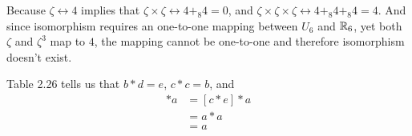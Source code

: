 \documentclass[12pt]{article}
\begin{document}
\begin{problem}[1.37]
Because $\zeta \leftrightarrow 4$ implies that $\zeta \times \zeta \leftrightarrow 4 +_{8} 4 = 0$, and $\zeta \times  \zeta \times \zeta \leftrightarrow 4+_{8} 4+_{8} 4 = 4$. And since isomorphism requires an one-to-one mapping between $U_6$ and $\mathbb{R}_6$, yet both $\zeta$ and $\zeta^3$ map to $4$, the mapping cannot be one-to-one and therefore isomorphism doesn't exist.
\end{problem}
\begin{problem}[2.1]
Table 2.26 tells us that $b*d=e$,  $c*c=b$, and 
 \begin{align*}
	 [(a*c)*e]*a &= [c*e] * a\\
	 &= a*a \\
	 &= a \\
\end{align*}
\end{problem}
\end{document}
